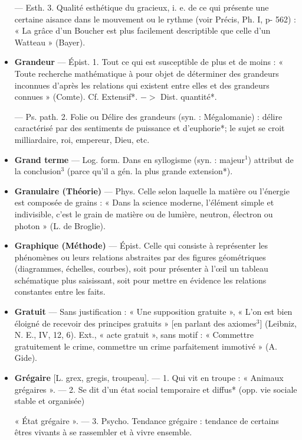 \begin{itemize}[leftmargin=1cm, label=, itemsep=1pt]
— Esth. 3. Qualité esthétique du
gracieux, i. e. de ce qui présente une
certaine aisance dans le mouvement
ou le rythme (voir Précis, Ph. I,
p- 562) : « La grâce d’un Boucher est
plus facilement descriptible que
celle d’un Watteau » (Bayer).

\item {\bf Grandeur} — Épist. 1. Tout ce qui est
susceptible de plus et de moins :
« Toute recherche mathématique à
pour objet de déterminer des grandeurs inconnues d'après les relations qui existent entre elles et des
grandeurs connues » (Comte). Cf.
Extensif*. $->$ Dist. quantité*.

— Ps. path. 2. Folie ou Délire
des grandeurs (syn. : Mégalomanie) :
délire caractérisé par des sentiments de puissance et d’euphorie*;
le sujet se croit milliardaire, roi,
empereur, Dieu, etc.

\item {\bf Grand terme} — Log. form. Dans en
syllogisme (syn. : majeur$^1$) attribut
de la conclusion$^3$ (parce qu'il a
gén. la plus grande extension*).

\item {\bf Granulaire (Théorie)} — Phys. Celle
selon laquelle la matière ou l’énergie
est composée de grains : « Dans la
science moderne, l'élément simple
et indivisible, c’est le grain de matière ou de lumière, neutron, électron ou photon » (L. de Broglie).

\item {\bf Graphique (Méthode)} — Épist. Celle
qui consiste à représenter les phénomènes
ou leurs relations abstraites
par des figures géométriques (diagrammes, échelles, courbes), soit
pour présenter à l'œil un tableau
schématique plus saisissant, soit
pour mettre en évidence les relations constantes entre les faits.

\item {\bf Gratuit} — Sans justification : « Une
supposition gratuite », « L'on est
bien éloigné de recevoir des principes gratuits » [en parlant des
axiomes$^3$] (Leibniz, N. E., IV, 12, 6).
Ext., « acte gratuit », sans motif :
« Commettre gratuitement le crime,
commettre un crime parfaitement
immotivé » (A. Gide).

\item {\bf Grégaire} [L. grex, gregis, troupeau].
— 1. Qui vit en troupe : « Animaux
grégaires ». — 2. Se dit d’un état
social temporaire et diffus* (opp.
vie sociale stable et organisée)

« État grégaire ». — 3. Psycho. Tendance grégaire : tendance de certains êtres vivants à se rassembler
et à vivre ensemble.


\end{itemize}
